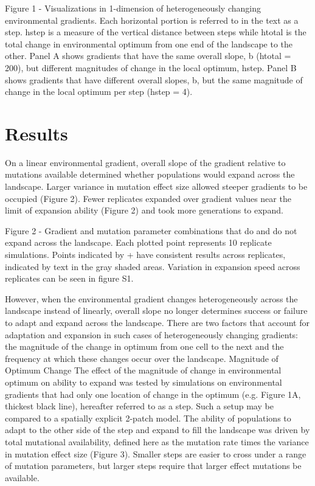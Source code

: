 Figure 1 - Visualizations in 1-dimension of heterogeneously changing environmental gradients. 
Each horizontal portion is referred to in the text as a step. hstep is a measure of the vertical 
distance between steps while htotal is the total change in environmental optimum from one end 
of the landscape to the other. Panel A shows gradients that have the same overall slope, b (htotal = 200), 
but different magnitudes of change in the local optimum, hstep. Panel B shows gradients that 
have different overall slopes, b, but the same magnitude of change in the local optimum per 
step (hstep = 4).

\section{Results}

On a linear environmental gradient, overall slope of the gradient relative to mutations 
available determined whether populations would expand across the landscape. Larger variance 
in mutation effect size allowed steeper gradients to be occupied (Figure 2). Fewer replicates 
expanded over gradient values near the limit of expansion ability (Figure 2) and took more 
generations to expand.

Figure 2 - Gradient and mutation parameter combinations that do and do not expand across 
the landscape. Each plotted point represents 10 replicate simulations. Points indicated 
by + have consistent results across replicates, indicated by text in the gray shaded areas. 
Variation in expansion speed across replicates can be seen in figure S1.

However, when the environmental gradient changes heterogeneously across the landscape 
instead of linearly, overall slope no longer determines success or failure to adapt and 
expand across the landscape. There are two factors that account for adaptation and 
expansion in such cases of heterogeneously changing gradients: the magnitude of the 
change in optimum from one cell to the next and the frequency at which these changes 
occur over the landscape.
Magnitude of Optimum Change
	The effect of the magnitude of change in environmental optimum on ability to expand 
	was tested by simulations on environmental gradients that had only one location of 
	change in the optimum (e.g. Figure 1A, thickest black line), hereafter referred to 
	as a step. Such a setup may be compared to a spatially explicit 2-patch model. The 
	ability of populations to adapt to the other side of the step and expand to fill the 
	landscape was driven by total mutational availability, defined here as the mutation 
	rate times the variance in mutation effect size (Figure 3). Smaller steps are easier 
	to cross under a range of mutation parameters, but larger steps require that larger 
	effect mutations be available.

